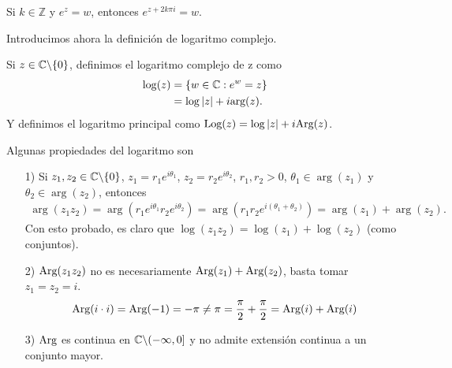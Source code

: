 \begin{obs}
    Si $k \in \mathbb{Z}$ y $e^z = w$, entonces $e^{z + 2k\pi i} = w$.
\end{obs}

Introducimos ahora la definición de logaritmo complejo.
\begin{defi}
    Si $z \in \mathbb{C} \backslash \{0\}$, definimos el logaritmo complejo de z como
    \begin{align*}
        \log(z) & = \{ w \in \mathbb{C} : e^w = z \} \\
                & = \log |z| + i\text{arg}(z).
    \end{align*}
    Y definimos el logaritmo principal como $\text{Log}(z) = \log|z| + i\text{Arg}(z)$.
\end{defi}
Algunas propiedades del logaritmo son
\begin{enumerate}
    \item[1)] Si $z_1,z_2 \in \mathbb{C} \backslash \{0\}$, $z_1 = r_1e^{i\theta_1}$, $z_2 = r_2e^{i\theta_2}$, $r_1,r_2 > 0$, $\theta_1 \in \arg(z_1)$ y $\theta_2 \in \arg(z_2)$, entonces
          \begin{align*}
              \arg(z_1z_2) = \arg(r_1e^{i\theta_1}r_2e^{i\theta_2}) = \arg(r_1r_2e^{i(\theta_1 + \theta_2)}) = \arg(z_1) + \arg(z_2).
          \end{align*}
          Con esto probado, es claro que $\log(z_1z_2) = \log(z_1) + \log(z_2)$ (como conjuntos).
    \item[2)] $\text{Arg}(z_1z_2)$ no es necesariamente $\text{Arg}(z_1) + \text{Arg}(z_2)$, basta tomar $z_1 = z_2 = i$.
          \begin{align*}
              \text{Arg}(i \cdot i) = \text{Arg}(-1) = -\pi \not = \pi = \frac{\pi}{2} + \frac{\pi}{2} = \text{Arg}(i) + \text{Arg}(i)
          \end{align*}
    \item[3)] $\text{Arg}$ es continua en $\mathbb{C} \backslash (-\infty,0]$ y no admite extensión continua a un conjunto mayor.
\end{enumerate}

